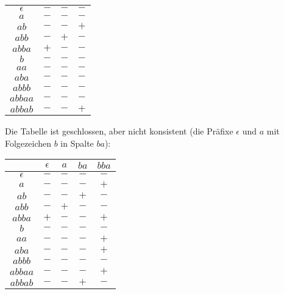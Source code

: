 \documentclass[11pt,a4paper]{article}
\begin{document}
\begin{loesung}
\begin{enumerate}
\begin{table}[h!]
\begin{tabular}{c|ccc}
                \hline
                $\epsilon$ & $-$ & $-$ & $-$ \\
                $a$ & $-$ & $-$ & $-$ \\
                $ab$ & $-$ & $-$ & $+$ \\
                $abb$ & $-$ & $+$ & $-$ \\
                $abba$ & $+$ & $-$ & $-$ \\
                \hline
                $b$ & $-$ & $-$ & $-$ \\
                $aa$ & $-$ & $-$ & $-$ \\
                $aba$ & $-$ & $-$ & $-$ \\
                $abbb$ & $-$ & $-$ & $-$ \\
                $abbaa$ & $-$ & $-$ & $-$ \\
                $abbab$ & $-$ & $-$ & $+$ \\
            \end{tabular}
        \end{table}
        \FloatBarrier
        Die Tabelle ist geschlossen, aber nicht konsistent (die Präfixe $\epsilon$ und $a$ mit Folgezeichen $b$ in Spalte $ba$):
        \begin{table}[h!]
            \centering
            \begin{tabular}{c|cccc}
                & $\epsilon$ & $a$ & $ba$ & $bba$ \\
                \hline
                $\epsilon$ & $-$ & $-$ & $-$ & $-$ \\
                $a$ & $-$ & $-$ & $-$ & $+$ \\
                $ab$ & $-$ & $-$ & $+$ & $-$ \\
                $abb$ & $-$ & $+$ & $-$ & $-$ \\
                $abba$ & $+$ & $-$ & $-$ & $+$ \\
                \hline
                $b$ & $-$ & $-$ & $-$ & $-$ \\
                $aa$ & $-$ & $-$ & $-$ & $+$ \\
                $aba$ & $-$ & $-$ & $-$ & $+$ \\
                $abbb$ & $-$ & $-$ & $-$ & $-$ \\
                $abbaa$ & $-$ & $-$ & $-$ & $+$ \\
                $abbab$ & $-$ & $-$ & $+$ & $-$ \\
            \end{tabular}
        \end{table}

\end{enumerate}
\end{loesung}
\end{document}
